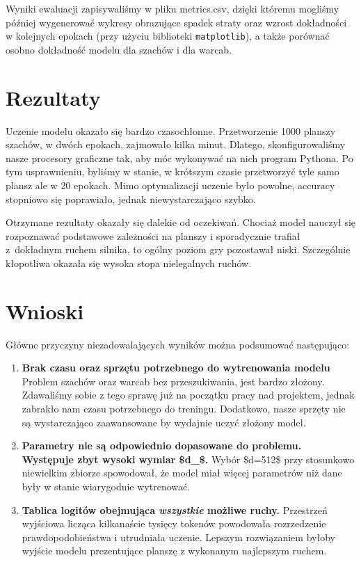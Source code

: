 \documentclass[12pt]{article}
\begin{document}
Wyniki ewaluacji zapisywaliśmy w pliku metrics.csv, dzięki któremu mogliśmy później wygenerować wykresy obrazujące spadek straty oraz wzrost dokładności w kolejnych epokach (przy użyciu biblioteki \texttt{matplotlib}), a także porównać osobno dokładność modelu dla szachów i dla warcab. 

\section{Rezultaty}\label{sec:results}

Uczenie modelu okazało się bardzo czasochłonne. Przetworzenie 1000 planszy szachów, w dwóch epokach, zajmowało kilka minut. Dlatego, skonfigurowaliśmy nasze procesory graficzne tak, aby móc wykonywać na nich program Pythona. Po tym usprawnieniu, byliśmy w stanie, w krótszym czasie przetworzyć tyle samo plansz ale w 20 epokach. Mimo optymalizacji uczenie było powolne, accuracy stopniowo się poprawiało, jednak niewystarczająco szybko.

Otrzymane rezultaty okazały się dalekie od oczekiwań. Chociaż model nauczył się rozpoznawać podstawowe zależności na planszy i sporadycznie trafiał z dokładnym ruchem silnika, to ogólny poziom gry pozostawał niski. Szczególnie kłopotliwa okazała się wysoka stopa nielegalnych ruchów. 


\section{Wnioski}\label{sec\:conclusions}
Główne przyczyny niezadowalających wyników można podsumować następująco:
\begin{enumerate}
    \item \textbf{Brak czasu oraz sprzętu potrzebnego do wytrenowania modelu} Problem szachów oraz warcab bez przeszukiwania, jest bardzo złożony. Zdawaliśmy sobie z tego sprawę już na początku pracy nad projektem, jednak zabrakło nam czasu potrzebnego do treningu. Dodatkowo, nasze sprzęty nie są wystarczająco zaawansowane by wydajnie uczyć złożony model.
    \item \textbf{Parametry nie są odpowiednio dopasowane do problemu. Występuje zbyt wysoki wymiar \$d\_{}\$.} Wybór \$d=512\$ przy stosunkowo niewielkim zbiorze spowodował, że model miał więcej parametrów niż dane były w stanie wiarygodnie wytrenować.
    \item \textbf{Tablica logitów obejmująca \emph{wszystkie} możliwe ruchy.} Przestrzeń wyjściowa licząca kilkanaście tysięcy tokenów powodowała rozrzedzenie prawdopodobieństwa i utrudniała uczenie. Lepszym rozwiązaniem byłoby wyjście modelu prezentujące planszę z wykonanym najlepszym ruchem.
\end{enumerate}
\end{document}
